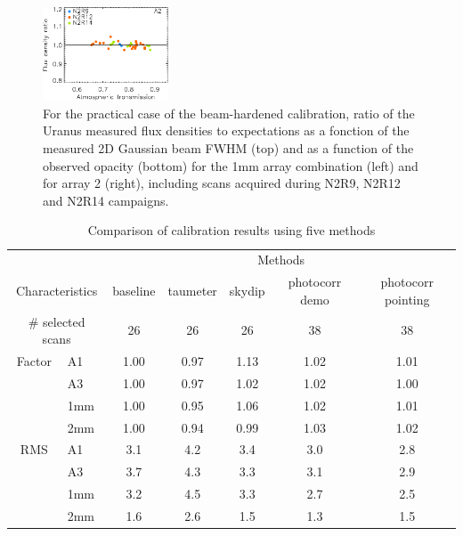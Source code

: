\begin{figure}[ht!]
\begin{center}
    \includegraphics[clip=true, width=0.3337\textwidth]{Figures/Calibration/plot_flux_density_ratio_obstau_uranus_corrected_skydip_photocorr_pointing_narrow_a2.pdf}
\caption[Uranus flux density stability using the
  practical case of the beam-hardened calibration]{For the
  practical case of the beam-hardened calibration, 
  ratio of the Uranus measured flux densities to expectations as a
  fonction of the measured 2D Gaussian beam FWHM (top) and as a
  function of the observed opacity (bottom) for the 1mm array
  combination (left) and for array 2 (right),
  including scans acquired during N2R9, N2R12 and N2R14 campaigns. }
\label{fig:calib_uranus_vs_atmtrans_all}
\end{center}
\end{figure}



\begin{table}[th]
\begin{center}
\begin{tabular}{|c|l|c|c|c|c|c|}
  \hline
  \multicolumn{2}{|c|}{}  &  \multicolumn{5}{|c|}{Methods} \\\cline{3-7}
  \multicolumn{2}{|c|}{Characteristics} &  baseline  & taumeter  &  skydip  &  photocorr demo & photocorr pointing \\
  \hline\hline
   \multicolumn{2}{|c|}{$\#$ selected scans} & 26    &       26  &    26    &    38           &    38 \\ 
  \hline 
  Factor &  A1          &   1.00  &  0.97   &  1.13    &   1.02    &   1.01  \\
       &  A3            &   1.00  &  0.97   &  1.02    &   1.02    &   1.00  \\
       &  1mm           &   1.00  &  0.95   &  1.06    &   1.02    &   1.01  \\
       &  2mm           &   1.00  &  0.94   &  0.99    &   1.03    &   1.02  \\
  \hline
  RMS  &  A1            &  3.1    &   4.2   &   3.4    &    3.0    &   2.8 \\
       &  A3            &  3.7    &   4.3   &   3.3    &    3.1    &   2.9 \\
       &  1mm           &  3.2    &   4.5   &   3.3    &    2.7    &   2.5 \\
       &  2mm           &  1.6    &   2.6   &   1.5    &    1.3    &   1.5 \\
\hline\hline
\end{tabular}
\caption[Comparison of calibration results using five methods]{Comparison of calibration results using five methods}
\label{tab:Abs_calibration_results_all}
\end{center}
\end{table}





